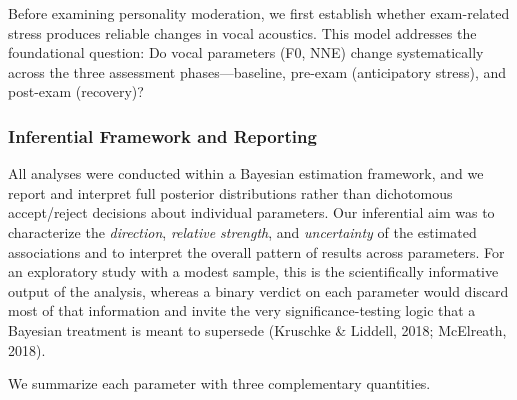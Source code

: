 \documentclass[
  english,
  man,floatsintext]{apa6}
\begin{document}
Before examining personality moderation, we first establish whether exam-related stress produces reliable changes in vocal acoustics. This model addresses the foundational question: Do vocal parameters (F0, NNE) change systematically across the three assessment phases---baseline, pre-exam (anticipatory stress), and post-exam (recovery)?

\subsubsection{Inferential Framework and Reporting}\label{inferential-framework-and-reporting}

All analyses were conducted within a Bayesian estimation framework, and we report and
interpret full posterior distributions rather than dichotomous accept/reject decisions
about individual parameters. Our inferential aim was to characterize the \emph{direction},
\emph{relative strength}, and \emph{uncertainty} of the estimated associations and to interpret the
overall pattern of results across parameters. For an exploratory study with a modest
sample, this is the scientifically informative output of the analysis, whereas a binary
verdict on each parameter would discard most of that information and invite the very
significance-testing logic that a Bayesian treatment is meant to supersede
(Kruschke \& Liddell, 2018; McElreath, 2018).

We summarize each parameter with three complementary quantities.
\end{document}
